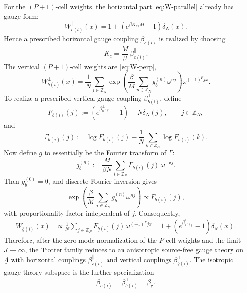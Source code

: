 For the \((P+1)\)-cell weights, the horizontal part \eqref{eq:W-parallel}
already has gauge form:
\begin{equation}
	W_{c(i)}^{\parallel}(x)
	=
	1+\left(e^{\beta K_c/M}-1\right)\delta_N(x).
\end{equation}
Hence a prescribed horizontal gauge coupling
\(\beta_{c(i)}^{\parallel}\) is realized by choosing
\begin{equation}
	K_c=\frac{M}{\beta}\,\beta_{c(i)}^{\parallel}.
	\label{eq:K-choice}
\end{equation}
The vertical \((P+1)\)-cell weights are \eqref{eq:W-perp},
\begin{equation}
	W_{\underline b(i)}^{\perp}(x)
	=
	\frac1N
	\sum_{j\in\mathbb Z_N}
	\exp\left(
	\frac{\beta}{M}\sum_{n\in\mathbb Z_N}g_b^{(n)}\omega^{nj}
	\right)
	\omega^{(-1)^P jx}.
\end{equation}
To realize a prescribed vertical gauge coupling
\(\beta_{\underline b(i)}^{\perp}\), define
\begin{equation}
	F_{\underline b(i)}(j)
	:=
	\left(e^{\beta_{\underline b(i)}^{\perp}}-1\right)+N\delta_N(j),
	\qquad
	j\in\mathbb Z_N,
\end{equation}
and
\begin{equation}
	\Gamma_{\underline b(i)}(j)
	:=
	\log F_{\underline b(i)}(j)
	-
	\frac1N\sum_{k\in\mathbb Z_N}\log F_{\underline b(i)}(k).
	\label{eq:Gamma-def}
\end{equation}
Now define $g$ to essentially be the Fourier transform of $\Gamma$:
\begin{equation}
	g_b^{(n)}
	:=
	\frac{M}{\beta N}
	\sum_{j\in\mathbb Z_N}
	\Gamma_{\underline b(i)}(j)\,\omega^{-nj}.
	\label{eq:g-choice}
\end{equation}
Then \(g_b^{(0)}=0\), and discrete Fourier inversion gives
\begin{equation}
	\exp\left(
	\frac{\beta}{M}\sum_{n\in\mathbb Z_N}g_b^{(n)}\omega^{nj}
	\right)
	\propto
	F_{\underline b(i)}(j),
\end{equation}
with proportionality factor independent of \(j\). Consequently,
\begin{align}
	W_{\underline b(i)}^{\perp}(x)
	&\propto
	\frac1N
	\sum_{j\in\mathbb Z_N}
	F_{\underline b(i)}(j)\,\omega^{(-1)^P jx}
	=
	1+\left(e^{\beta_{\underline b(i)}^{\perp}}-1\right)\delta_N(x).
	\label{eq:Wperp-gauge-form}
\end{align}
Therefore, after the zero-mode normalization of the \(P\)-cell weights and the
limit \(J\to\infty\), the Trotter family reduces to an anisotropic source-free
gauge theory on \(\underline\Lambda\) with horizontal couplings
\(\beta_{c(i)}^{\parallel}\) and vertical couplings
\(\beta_{\underline b(i)}^{\perp}\). The isotropic gauge theory-subspace is the further
specialization
\begin{equation}
	\beta_{c(i)}^{\parallel}
	=
	\beta_{\underline b(i)}^{\perp}
	=
	\beta_{\mathrm g}.
	\label{eq:isotropic-gauge}
\end{equation}

